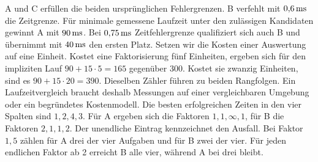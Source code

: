 A und C erfüllen die beiden ursprünglichen Fehlergrenzen. B verfehlt mit \(0{,}6\,\mathrm{ms}\) die Zeitgrenze. Für minimale gemessene Laufzeit unter den zulässigen Kandidaten gewinnt A mit \(90\,\mathrm{ms}\). Bei \(0{,}75\,\mathrm{ms}\) Zeitfehlergrenze qualifiziert sich auch B und übernimmt mit \(40\,\mathrm{ms}\) den ersten Platz.
Setzen wir die Kosten einer Auswertung auf eine Einheit. Kostet eine Faktorisierung fünf Einheiten, ergeben sich für den impliziten Lauf \(90+15\cdot5=165\) gegenüber 300. Kostet sie zwanzig Einheiten, sind es \(90+15\cdot20=390\). Dieselben Zähler führen zu beiden Rangfolgen. Ein Laufzeitvergleich braucht deshalb Messungen auf einer vergleichbaren Umgebung oder ein begründetes Kostenmodell.
Die besten erfolgreichen Zeiten in den vier Spalten sind \(1,2,4,3\). Für A ergeben sich die Faktoren \(1,1,\infty,1\), für B die Faktoren \(2,1,1,2\). Der unendliche Eintrag kennzeichnet den Ausfall. Bei Faktor \(1{,}5\) zählen für A drei der vier Aufgaben und für B zwei der vier. Für jeden endlichen Faktor ab 2 erreicht B alle vier, während A bei drei bleibt.



